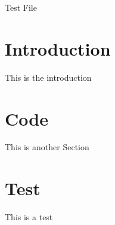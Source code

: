 \documentclass{article}
\begin{document}
	Test File
	
	\section{Introduction}
	
	This is the introduction
	
	\section{Code}
	
	This is another Section
	
	\section{Test}
	
	This is a test
	
\end{document}
